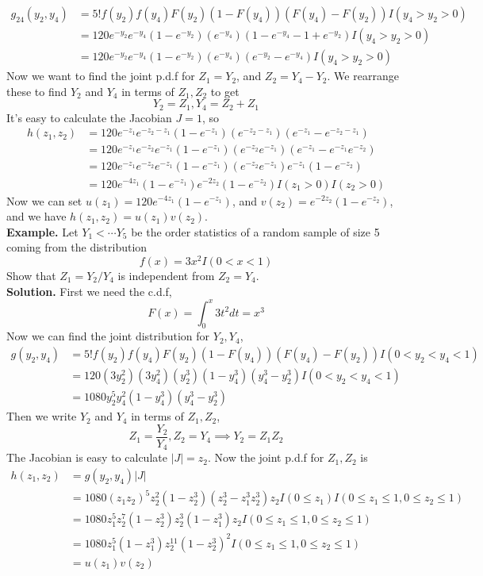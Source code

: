 \documentclass[openany]{report}
\begin{document}
    \begin{align*}
        g_{24}(y_2,y_4) &= 5!f(y_2)f(y_4)F(y_2)(1-F(y_4))(F(y_4) - F(y_2))I(y_4 > y_2 > 0)  \\
        &= 120e^{-y_2}e^{-y_4}(1-e^{-y_2})(e^{-y_4})(1 - e^{-y_4}- 1 + e^{-y_2})I(y_4 > y_2 > 0)\\
        &=120e^{-y_2}e^{-y_4}(1-e^{-y_2})(e^{-y_4})(e^{-y_2} -e^{-y_4})I(y_4 > y_2 > 0)
    \end{align*}
    Now we want to find the joint p.d.f for $Z_1 = Y_2$, and $Z_2 = Y_4 - Y_2$. We rearrange these to find $Y_2$ and $Y_4$ in terms of $Z_1,Z_2$ to get 
    \[Y_2 = Z_1, Y_4 = Z_2 + Z_1\]
    It's easy to calculate the Jacobian $J = 1$, so 
    \begin{align*}
        h(z_1,z_2) &= 120e^{-z_1}e^{-z_2 - z_1}(1-e^{-z_1})(e^{-z_2 - z_1})(e^{-z_1} - e^{-z_2 - z_1})\\
        &=120e^{-z_1}e^{-z_2}e^{-z_1}(1-e^{-z_1})(e^{-z_2}e^{-z_1})(e^{-z_1}-e^{-z_1}e^{-z_2})\\
        &=120e^{-z_1}e^{-z_2}e^{-z_1}(1-e^{-z_1})(e^{-z_2}e^{-z_1})e^{-z_1}(1-e^{-z_2})\\
        &= 120e^{-4z_1}(1-e^{-z_1})e^{-2z_2}(1-e^{-z_2})I(z_1 > 0)I(z_2 > 0)
    \end{align*}
    Now we can set $u(z_1) = 120e^{-4z_1}(1-e^{-z_1})$, and $v(z_2) = e^{-2z_2}(1-e^{-z_2})$, and we have $h(z_1, z_2) = u(z_1)v(z_2)$.\\[2ex]
    \textbf{Example.} Let $Y_1 < \cdots Y_5$ be the order statistics of a random sample of size 5 coming from the distribution 
    \[f(x) = 3x^2I(0 < x < 1)\]
    Show that $Z_1 = Y_2 / Y_4$ is independent from $Z_2 = Y_4$.\\[2ex]
    \textbf{Solution.} First we need the c.d.f,
    \[F(x) = \int_0^x 3t^2dt = x^3\]
    Now we can find the joint distribution for $Y_2, Y_4$, 
    \begin{align*}
        g(y_2,y_4) &= 5!f(y_2)f(y_4)F(y_2)(1-F(y_4))(F(y_4) - F(y_2))I(0 < y_2 < y_4 < 1)\\
        &= 120(3y_2^2)(3y_4^2)(y_2^3)(1 - y_4^3)(y_4^3 - y_2^3)I(0 < y_2 < y_4 < 1)\\
        &= 1080y_2^5y_4^2(1-y_4^3)(y_4^3-y_2^3)
    \end{align*}
    Then we write $Y_2$ and $Y_4$ in terms of $Z_1, Z_2$, 
    \[Z_1 = \frac{Y_2}{Y_4}, Z_2 = Y_4 \implies Y_2 = Z_1Z_2\]
    The Jacobian is easy to calculate $|J| = z_2$. Now the joint p.d.f for $Z_1,Z_2$ is 
    \begin{align*}
        h(z_1,z_2) &= g(y_2,y_4)|J|\\
        &= 1080(z_1z_2)^5z_2^2(1-z_2^3)(z_2^3 - z_1^3z_2^3)z_2I(0 \leq z_1)I(0 \leq z_1 \leq 1, 0 \leq z_2 \leq 1)\\
        &= 1080z_1^5z_2^7(1-z_2^3)z_2^3(1 - z_1^3)z_2I(0 \leq z_1 \leq 1, 0 \leq z_2 \leq 1)\\
        &= 1080z_1^5(1-z_1^3)z_2^{11}(1-z_2^3)^2I(0 \leq z_1 \leq 1, 0 \leq z_2 \leq 1)\\
        &= u(z_1)v(z_2)
    \end{align*}
\end{document}
